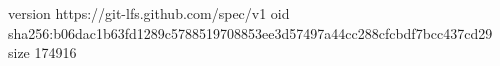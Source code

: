 version https://git-lfs.github.com/spec/v1
oid sha256:b06dac1b63fd1289c5788519708853ee3d57497a44cc288cfcbdf7bcc437cd29
size 174916

